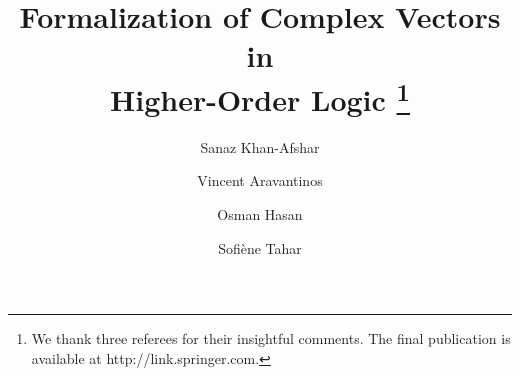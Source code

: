\documentclass{llncs}
\begin{document}
\pagestyle{empty}

\mainmatter


\title{Formalization of Complex Vectors in \\
Higher-Order Logic \thanks{We thank three referees for their insightful comments.
The final publication is available at http://link.springer.com.}}


\author{Sanaz Khan-Afshar  \and Vincent Aravantinos \and Osman Hasan \and Sofi\`{e}ne Tahar}
 \maketitle

\newcommand\indnt{\phantom{\ensuremath{\mathtt{\vdash\ }}}}
\newcommand\indntt{\indnt\indnt}
\newcommand\indnttt{\indntt\indnt}
\newcommand\C{\ensuremath{complex}\xspace}
\newcommand\R{\ensuremath{real}\xspace}
\newcommand\Cthree{\ensuremath{\mathtt{complex^3}}\xspace}
\newcommand\CN{\ensuremath{\mathtt{{complex^N}}}\xspace}
\newcommand\cfun{\ensuremath{\mathtt{cfun}}\xspace}
\newcommand\dst{\ensuremath{\mathtt{dest\_cart}}\xspace}
\newcommand\mk{\ensuremath{\mathtt{mk\_cart}}\xspace}
\newcommand\copofmat{cop\_of\_cmatrix\xspace}
\newcommand\cmatofop{cmatrix\_of\_cop\xspace}

\def\hol#1{}
\def\vvec#1{\vec{#1}\,}
\def\rr{\vec{r}}
\def\vv{\vec{v}}
\def\ne{n_{\rm e}}
\def\ni{n_{\rm i}}
\def\no{n_{\rm 0}}
\def\me{m_{\rm e}}
\def\mi{m_{\rm i}}
\def\Te{T_{\rm e}}
\def\Ti{T_{\rm i}}
\def\Leftrightarrowdef{\Leftrightarrow}
\def\isincidentbasis{is\_incident\_basis\ }
\def\Xofbasis{x1\_of\_basis\ }
\def\Yofbasis{x2\_of\_basis\ }
\def\Zofbasis{x3\_of\_basis\ }

\def\emf{emf}
\let\odot=\cdot
\def\Lambda#1{\lambda #1\qdot}
\def\wofwave{\omega\_of\_w\ }
\def\eofwave{e\_of\_w\ }
\def\Exists#1{\exists #1\qdot}
\def\mapt{map\_triple\ }
\def\hofwave{h\_of\_w\ }
\def\planewave{plane\_wave\ }
\def\eqdef{=}
\def\NS{\negthinspace\negthinspace}
\def\isplanewaveatitf{is\_plane\_wave\_at\_interface\ }
\def\isplanewave{is\_plane\_wave\ }
\def\isvaliditf{is\_valid\_interface\ }
\def\isinplan{is\_in\_plane\ }
\def\kofwave{k\_of\_w\ }
\def\boundaryconditions{boundary\_conditions\ }
\def\Normalofplan{norm\_of\_plane}
\def\normalofplan{\Normalofplan\ }
\def\forceindent{\ \ }
\def\vdashdef{\vdash}
\def\qdot{.\ }
\def\Forall#1{\forall #1\qdot}
\def\isposonbasis{is\_positive\_orthonormal\_basis\ }
\def\planofitf{plane\_of\_interface\ }
\def\aresymetric{are\_sym\_wrt\ }
\def\vectorsine{vector\_sine\ }
\def\vecnorm#1{\parallel\negthinspace #1\negthinspace\parallel}
\def\temode{te\_mode\ }
\def\tmmode{tm\_mode\ }
\def\boundaryconds{boundary\_conditions\ }
\def\eofemf{e\_of\_emf\ }
\def\hofemf{h\_of\_emf\ }
\end{document}
